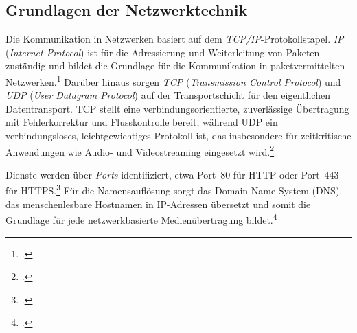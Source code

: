 \documentclass[12pt,a4paper]{report}
\begin{document}
  \subsection{Grundlagen der Netzwerktechnik}  
  Die Kommunikation in Netzwerken basiert auf dem \emph{TCP/IP}-Protokollstapel. 
  \emph{IP} (\emph{Internet Protocol}) ist für die Adressierung und Weiterleitung von Paketen zuständig 
  und bildet die Grundlage für die Kommunikation in paketvermittelten Netzwerken.\footcite[Vgl.][S.~438]{tanenbaum_computernetworks}  
  Darüber hinaus sorgen \emph{TCP} (\emph{Transmission Control Protocol}) und \emph{UDP} (\emph{User Datagram Protocol}) 
  auf der Transportschicht für den eigentlichen Datentransport. 
  TCP stellt eine verbindungsorientierte, zuverlässige Übertragung mit Fehlerkorrektur und Flusskontrolle bereit, 
  während UDP ein verbindungsloses, leichtgewichtiges Protokoll ist, 
  das insbesondere für zeitkritische Anwendungen wie Audio- und Videostreaming eingesetzt wird.\footcite[Vgl.][S.~228]{kurose_networking}
 
  Dienste werden über \emph{Ports} identifiziert, etwa Port~80 für HTTP oder Port~443 für HTTPS.\footcite[Vgl.][S.~554]{tanenbaum_computernetworks}  
  Für die Namensauflösung sorgt das Domain Name System (DNS), 
  das menschenlesbare Hostnamen in IP-Adressen übersetzt 
  und somit die Grundlage für jede netzwerkbasierte Medienübertragung bildet.\footcite[Vgl.][S.~611~f.]{tanenbaum_computernetworks}  
\end{document}
